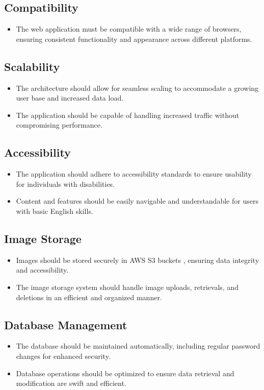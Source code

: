 
\subsection{Compatibility}
\begin{itemize}
	\item The web application must be compatible with a wide range of browsers, ensuring consistent functionality and appearance across different platforms.
\end{itemize}

\subsection{Scalability}
\begin{itemize}
	\item The architecture should allow for seamless scaling to accommodate a growing user base and increased data load.
	\item The application should be capable of handling increased traffic without compromising performance.
\end{itemize}

\subsection{Accessibility}
\begin{itemize}
	\item The application should adhere to accessibility standards to ensure usability for individuals with disabilities.
	\item Content and features should be easily navigable and understandable for users with basic English skills.
\end{itemize}

\subsection{Image Storage}
\begin{itemize}
	\item Images should be stored securely in AWS S3 buckets \citep{aws-s3-storage}, ensuring data integrity and accessibility.
	\item The image storage system should handle image uploads, retrievals, and deletions in an efficient and organized manner.
\end{itemize}

\subsection{Database Management}
\begin{itemize}
	\item The database should be maintained automatically, including regular password changes for enhanced security.
	\item Database operations should be optimized to ensure data retrieval and modification are swift and efficient.
\end{itemize}

